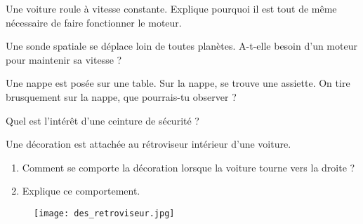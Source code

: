 \begin{exercise}
    Une voiture roule à vitesse constante. Explique pourquoi il est tout de même nécessaire de faire fonctionner le moteur.
\end{exercise}

\begin{exercise}
    Une sonde spatiale se déplace loin de toutes planètes. A-t-elle besoin d'un moteur pour maintenir sa vitesse ?
\end{exercise}

\begin{exercise}
    Une nappe est posée sur une table. Sur la nappe, se trouve une assiette. On tire brusquement sur la nappe, que pourrais-tu observer ?
\end{exercise}

\begin{exercise}
    Quel est l'intérêt d'une ceinture de sécurité ?
\end{exercise}

\begin{exercise}
    Une décoration est attachée au rétroviseur intérieur d'une voiture.
    \begin{enumerate}
        \item Comment se comporte la décoration lorsque la voiture tourne vers la droite ?
        \item Explique ce comportement.
    \end{enumerate}
    \begin{figure}[h!]
        \centering
        \texttt{[image: des\_retroviseur.jpg]}
        \label{des_retroviseur}
    \end{figure}
\end{exercise}